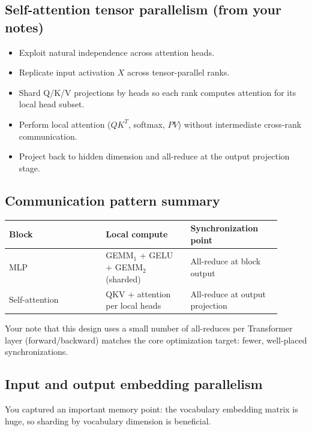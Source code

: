 \documentclass[11pt]{article}
\begin{document}
\subsection{Self-attention tensor parallelism (from your notes)}
\begin{itemize}[leftmargin=1.2em]
\item Exploit natural independence across attention heads.
\item Replicate input activation \(X\) across tensor-parallel ranks.
\item Shard Q/K/V projections by heads so each rank computes attention for its local head subset.
\item Perform local attention (\(QK^T\), softmax, \(PV\)) without intermediate cross-rank communication.
\item Project back to hidden dimension and all-reduce at the output projection stage.
\end{itemize}

\subsection{Communication pattern summary}
\begin{center}
\renewcommand{\arraystretch}{1.15}
\begin{tabular}{|p{0.32\linewidth}|p{0.28\linewidth}|p{0.30\linewidth}|}
\hline
\textbf{Block} & \textbf{Local compute} & \textbf{Synchronization point} \\
\hline
MLP & GEMM$_1$ + GELU + GEMM$_2$ (sharded) & All-reduce at block output \\
\hline
Self-attention & QKV + attention per local heads & All-reduce at output projection \\
\hline
\end{tabular}
\end{center}

Your note that this design uses a small number of all-reduces per Transformer layer (forward/backward) matches the core optimization target: fewer, well-placed synchronizations.

\subsection{Input and output embedding parallelism}
You captured an important memory point: the vocabulary embedding matrix is huge, so sharding by vocabulary dimension is beneficial.
\end{document}
